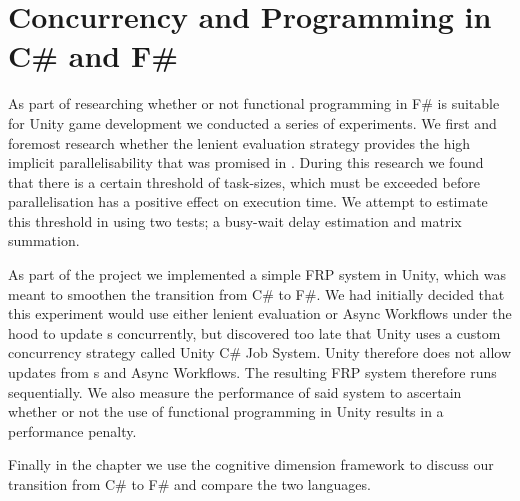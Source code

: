 \chapter{Concurrency and Programming in C\# and F\#}
As part of researching whether or not functional programming in F\# is suitable for Unity game development we conducted a series of experiments. We first and foremost research whether the lenient evaluation strategy provides the high implicit parallelisability that was promised in \cite{DBLP:journals/cl/Tremblay-parallel}. During this research we found that there is a certain threshold of task-sizes, which must be exceeded before parallelisation has a positive effect on execution time. We attempt to estimate this threshold in  using two tests; a busy-wait delay estimation and matrix summation.

As part of the project we implemented a simple \gls{FRP} system in Unity, which was meant to smoothen the transition from C\# to F\#. We had initially decided that this experiment would use either lenient evaluation or Async Workflows under the hood to update s concurrently, but discovered too late that Unity uses a custom concurrency strategy called Unity C\# Job System\cite{unity:csharp:job:system}. Unity therefore does not allow  updates from s and Async Workflows\cite{unity:async}. The resulting \gls{FRP} system therefore runs sequentially. We also measure the performance of said system to ascertain whether or not the use of functional programming in Unity results in a performance penalty. 

Finally in the chapter we use the cognitive dimension framework to discuss our transition from C\# to F\# and compare the two languages.





